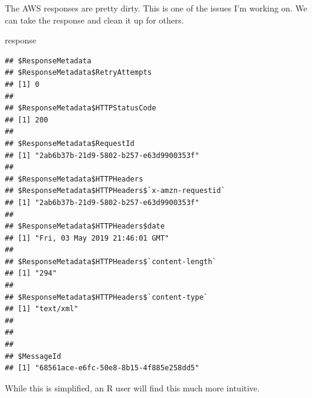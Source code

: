 \documentclass[]{book}
\newenvironment{Shaded}{\begin{snugshade}}{\end{snugshade}}
\newcommand{\ControlFlowTok}[1]{\textcolor[rgb]{0.13,0.29,0.53}{\textbf{#1}}}
\newcommand{\DataTypeTok}[1]{\textcolor[rgb]{0.13,0.29,0.53}{#1}}
\newcommand{\KeywordTok}[1]{\textcolor[rgb]{0.13,0.29,0.53}{\textbf{#1}}}
\newcommand{\NormalTok}[1]{#1}
\newcommand{\OperatorTok}[1]{\textcolor[rgb]{0.81,0.36,0.00}{\textbf{#1}}}
\newcommand{\OtherTok}[1]{\textcolor[rgb]{0.56,0.35,0.01}{#1}}
\newcommand{\StringTok}[1]{\textcolor[rgb]{0.31,0.60,0.02}{#1}}
\begin{document}
\begin{Shaded}
\end{Shaded}

The AWS responses are pretty dirty. This is one of the issues I'm working on. We can take the response and clean it up for others.

\begin{Shaded}
\begin{Highlighting}[]
\NormalTok{response }
\end{Highlighting}
\end{Shaded}

\begin{verbatim}
## $ResponseMetadata
## $ResponseMetadata$RetryAttempts
## [1] 0
## 
## $ResponseMetadata$HTTPStatusCode
## [1] 200
## 
## $ResponseMetadata$RequestId
## [1] "2ab6b37b-21d9-5802-b257-e63d9900353f"
## 
## $ResponseMetadata$HTTPHeaders
## $ResponseMetadata$HTTPHeaders$`x-amzn-requestid`
## [1] "2ab6b37b-21d9-5802-b257-e63d9900353f"
## 
## $ResponseMetadata$HTTPHeaders$date
## [1] "Fri, 03 May 2019 21:46:01 GMT"
## 
## $ResponseMetadata$HTTPHeaders$`content-length`
## [1] "294"
## 
## $ResponseMetadata$HTTPHeaders$`content-type`
## [1] "text/xml"
## 
## 
## 
## $MessageId
## [1] "68561ace-e6fc-50e8-8b15-4f885e258dd5"
\end{verbatim}

While this is simplified, an R user will find this much more intuitive.

\begin{Shaded}
\end{Shaded}
\end{document}
